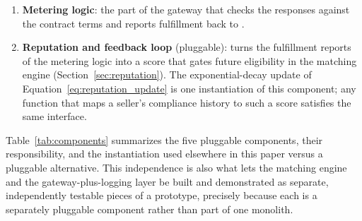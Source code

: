 \begin{enumerate}
  \item \textbf{Metering logic}: the part of the gateway that checks the
    responses against the contract terms and reports fulfillment back to
    \NoesisMarket{}.

  \item \textbf{Reputation and feedback loop} (pluggable): turns the
    fulfillment reports of the metering logic into a score that gates future
    eligibility in the matching engine (Section~\ref{sec:reputation}). The
    exponential-decay update of Equation~\eqref{eq:reputation_update} is one
    instantiation of this component; any function that maps a seller's
    compliance history to such a score satisfies the same interface.
\end{enumerate}

Table~\ref{tab:components} summarizes the five pluggable components,
their responsibility, and the instantiation used elsewhere in this paper versus a
pluggable alternative. This independence is also what lets the matching
engine and the gateway-plus-logging layer be built and demonstrated as
separate, independently testable pieces of a prototype, precisely because
each is a separately pluggable component rather than part of one monolith.

